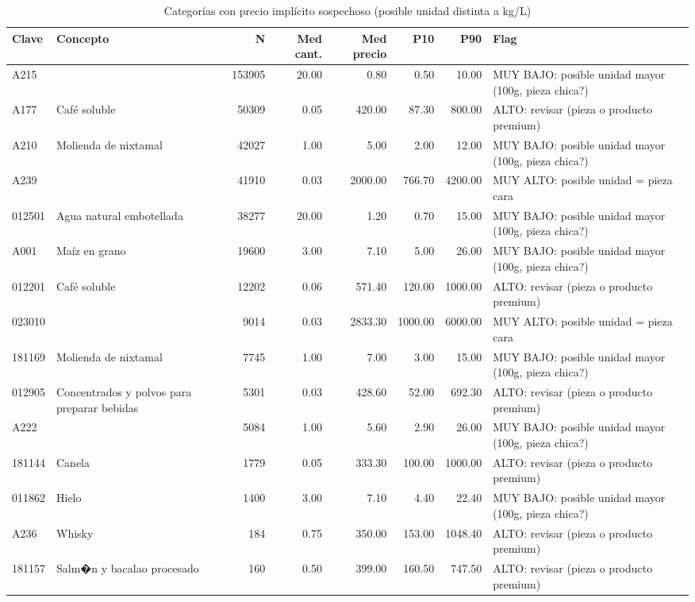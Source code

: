 \begin{table}[ht]
\centering
\caption{Categor\'ias con precio impl\'icito sospechoso (posible unidad distinta a kg/L)} 
\label{tab:19b_categorias_precio_sospechoso}
\begin{tabular}{llrrrrrl}
  \toprule
Clave & Concepto & N & Med cant. & Med precio & P10 & P90 & Flag \\ 
  \midrule
A215 &  & 153905 & 20.00 & 0.80 & 0.50 & 10.00 & MUY BAJO: posible unidad mayor (100g, pieza chica?) \\ 
  A177 & Café soluble & 50309 & 0.05 & 420.00 & 87.30 & 800.00 & ALTO: revisar (pieza o producto premium) \\ 
  A210 & Molienda de nixtamal & 42027 & 1.00 & 5.00 & 2.00 & 12.00 & MUY BAJO: posible unidad mayor (100g, pieza chica?) \\ 
  A239 &  & 41910 & 0.03 & 2000.00 & 766.70 & 4200.00 & MUY ALTO: posible unidad = pieza cara \\ 
  012501 & Agua natural embotellada & 38277 & 20.00 & 1.20 & 0.70 & 15.00 & MUY BAJO: posible unidad mayor (100g, pieza chica?) \\ 
  A001 & Maíz en grano & 19600 & 3.00 & 7.10 & 5.00 & 26.00 & MUY BAJO: posible unidad mayor (100g, pieza chica?) \\ 
  012201 & Café soluble & 12202 & 0.06 & 571.40 & 120.00 & 1000.00 & ALTO: revisar (pieza o producto premium) \\ 
  023010 &  & 9014 & 0.03 & 2833.30 & 1000.00 & 6000.00 & MUY ALTO: posible unidad = pieza cara \\ 
  181169 & Molienda de nixtamal & 7745 & 1.00 & 7.00 & 3.00 & 15.00 & MUY BAJO: posible unidad mayor (100g, pieza chica?) \\ 
  012905 & Concentrados y polvos para preparar bebidas & 5301 & 0.03 & 428.60 & 52.00 & 692.30 & ALTO: revisar (pieza o producto premium) \\ 
  A222 &  & 5084 & 1.00 & 5.60 & 2.90 & 26.00 & MUY BAJO: posible unidad mayor (100g, pieza chica?) \\ 
  181144 & Canela & 1779 & 0.05 & 333.30 & 100.00 & 1000.00 & ALTO: revisar (pieza o producto premium) \\ 
  011862 & Hielo & 1400 & 3.00 & 7.10 & 4.40 & 22.40 & MUY BAJO: posible unidad mayor (100g, pieza chica?) \\ 
  A236 & Whisky & 184 & 0.75 & 350.00 & 153.00 & 1048.40 & ALTO: revisar (pieza o producto premium) \\ 
  181157 & Salm�n y bacalao procesado & 160 & 0.50 & 399.00 & 160.50 & 747.50 & ALTO: revisar (pieza o producto premium) \\ 

\end{tabular}
\end{table}
